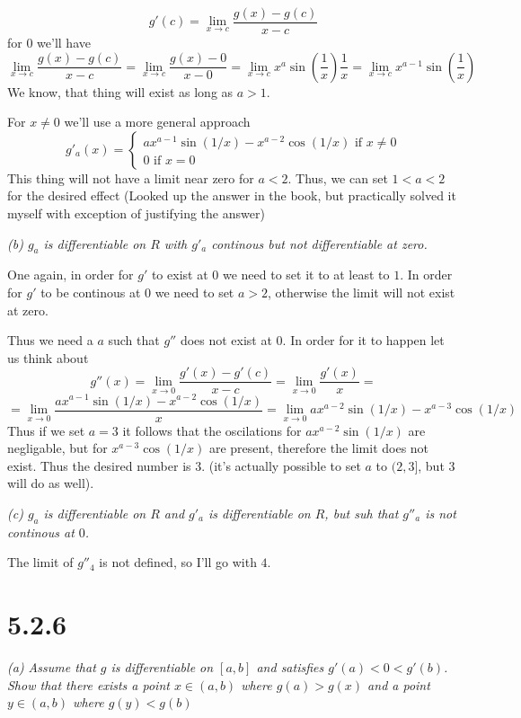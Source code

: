 \documentclass[11pt,oneside,titlepage]{book}
\begin{document}
$$g'(c) = \lim_{x \to c}\frac{g(x) - g(c)}{x - c}$$
for 0 we'll have
$$\lim_{x \to c}\frac{g(x) - g(c)}{x - c} =
\lim_{x \to c}\frac{g(x) - 0}{x - 0} =
\lim_{x \to c}x^a\sin(\frac{1}{x}) \frac{1}{x} =
\lim_{x \to c}x^{a - 1}\sin(\frac{1}{x}) $$
We know, that thing will exist as long as $a > 1$.

For $x \neq 0$ we'll use a more general approach
\begin{equation}
  g'_a(x) =
  \begin{cases}
    ax^{a - 1} \sin(1/x) - x^{a - 2}\cos(1/x) \text{ if } x \neq 0 \\
    0 \text{ if } x = 0
  \end{cases}
\end{equation}
This thing will not have a limit near zero for $a < 2$. Thus,
we can set $1 < a <2 $ for the desired effect (Looked up the answer in the
book, but practically solved it myself with exception of justifying
the answer)

\textit{(b) $g_a$ is differentiable on $R$ with $g'_a$ continous but not
  differentiable at zero.}

One again, in order for $g'$ to exist at $0$ we need to set it to at least to
$1$. In order for $g'$ to be continous at $0$ we need to set $a > 2$,
otherwise the limit will not exist at zero.

Thus we need a $a$ such that $g''$ does not exist at $0$. In order for it to
happen let us think about
$$g''(x) = \lim_{x \to 0} \frac{g'(x) - g'(c)}{x - c} =
\lim_{x \to 0} \frac{g'(x)}{x} =
$$
$$= \lim_{x \to 0} \frac{ax^{a - 1} \sin(1/x) - x^{a - 2}\cos(1/x)}{x} =
\lim_{x \to 0} ax^{a - 2} \sin(1/x) - x^{a - 3}\cos(1/x) $$
Thus if we set $a = 3$ it follows that the oscilations for
$ax^{a - 2} \sin(1/x)$ are negligable, but for $x^{a - 3}\cos(1/x)$
are present, therefore the limit does not exist. Thus the desired number is
$3$. (it's actually possible to set $a$ to $(2, 3]$, but 3 will do as well).

\textit{(c) $g_a$ is differentiable on $R$ and $g'_a$ is differentiable on
  $R$, but suh that $g''_a$ is not continous at $0$.}

The limit of $g''_4$ is not defined, so I'll go with $4$.

\section*{5.2.6}
\textit{(a) Assume that $g$ is differentiable on $[a, b]$ and satisfies
  $g'(a) < 0 < g'(b)$. Show that there exists a point $x \in (a, b)$ where
  $g(a) > g(x)$ and a point $y \in (a, b)$ where $g(y) < g(b)$}
\end{document}
